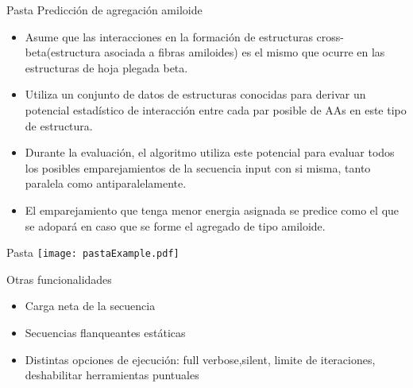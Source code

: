 \documentclass{beamer}
\begin{document}
\begin{frame}{Pasta}
Predicción de agregación amiloide
\begin{itemize}
 \item Asume que las interacciones en la formación de estructuras cross-beta(estructura asociada a fibras amiloides) es el mismo que ocurre en las estructuras de hoja plegada beta.
 \item Utiliza un conjunto de datos de estructuras conocidas para derivar un potencial estadístico de interacción entre cada par posible de AAs en este tipo de estructura.
 \item Durante la evaluación, el algoritmo utiliza este potencial para evaluar todos los posibles emparejamientos de la secuencia input con si misma, tanto paralela como antiparalelamente.
 \item El emparejamiento que tenga menor energia asignada se predice como el que se adopará en caso que se forme el agregado de tipo amiloide.
\end{itemize}

 
\end{frame}

\begin{frame}{Pasta}	
 \texttt{[image: pastaExample.pdf]}
\end{frame}

% 
% 

\begin{frame}{Otras funcionalidades}
 \begin{itemize}
  \item Carga neta de la secuencia
  \item Secuencias flanqueantes estáticas
  \item Distintas opciones de ejecución: full verbose,silent, limite de iteraciones, deshabilitar herramientas puntuales
 \end{itemize}
\end{frame}
\end{document}
